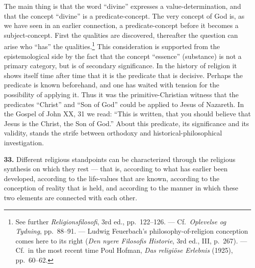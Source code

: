 \documentclass[12pt]{book}
\newcommand{\hnum}[1]{\textbf{#1.}\enspace}
\newcommand{\opage}[1]{\marginnote{\footnotesize\textit{[#1]}}}
\begin{document}
The main thing is that the word ``divine'' expresses a value-determination, and that the concept ``divine'' is
a predicate-concept. The very concept of God is, as we have seen in an earlier connection, a predicate-concept
before it becomes a subject-concept. First the qualities are discovered, thereafter the question can arise who
``has'' the qualities.\footnote{See further \textit{Religionsfilosofi}, 3rd ed., pp.\ 122--126. --- Cf.\
\textit{Oplevelse og Tydning}, pp.\ 88--91. --- Ludwig Feuerbach's philosophy-of-religion conception comes here
to its right (\textit{Den nyere Filosofis Historie}, 3rd ed., III, p.\ 267). --- Cf.\ in the most recent time
Poul Hofman, \textit{Das religiöse Erlebnis} (1925), pp.\ 60--62.} This consideration is supported from the
epistemological side by the fact that the concept ``essence'' (substance) is not a primary category, but is of
secondary significance. In the history of religion it shows itself time after time that it is the predicate
that is decisive. Perhaps the predicate is known beforehand, and one has waited with tension for the
possibility of applying it. Thus it was the primitive-Christian witness that the predicates ``Christ'' and
``Son of God'' could be applied to Jesus of Nazareth. In the Gospel of John XX, 31 we read: ``This is written,
that you should believe that Jesus is the Christ, the Son of God.'' About this predicate, its significance and
its validity, stands the strife between orthodoxy and historical-philosophical investigation.

\hnum{33} Different religious standpoints can be characterized through the religious synthesis on which they
rest --- that is, according to what has earlier been developed, according to the life-values that are known,
according to the conception of reality \opage{111}that is held, and according to the manner in which these two elements
are connected with each other.
\end{document}
